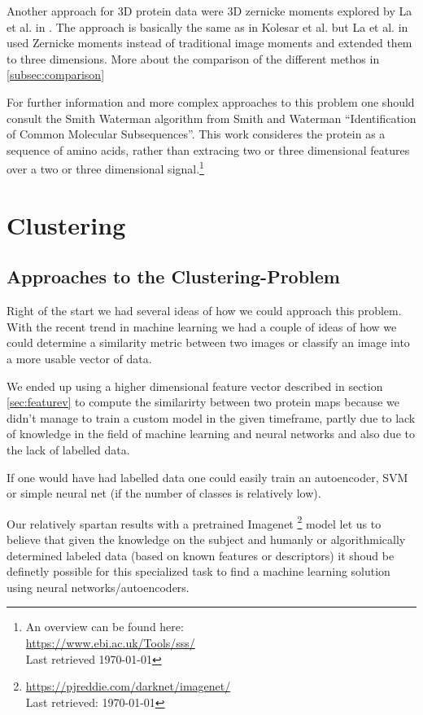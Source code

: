 \documentclass[journal]{vgtc}       %
\newcommand{\todo}[1]{\textcolor{red}{\textbf{TODO:} #1}}
\begin{document}
Another approach for 3D protein data were 3D zernicke moments explored by La et al. in \cite{3dsurfer}. The approach is basically the same as in Kolesar et al. but La et al.  in \cite{3dsurfer} used Zernicke moments instead of traditional image moments and extended them to three dimensions. More about the comparison of the different methos in \ref{subsec:comparison}

For further information and more complex approaches to this problem one should consult the Smith Waterman algorithm from Smith and Waterman ``Identification of Common Molecular Subsequences''\cite{smithwater}. This work consideres the protein as a sequence of amino acids, rather than extracing two or three dimensional features over a two or three dimensional signal.\footnote{An overview can be found here: \\ \url{https://www.ebi.ac.uk/Tools/sss/}\\ Last retrieved \today}


\section{Clustering}
\subsection{Approaches to the Clustering-Problem}

Right of the start we had several ideas of how we could approach this problem. 
With the recent trend in machine learning we had a couple of ideas of how we could determine a similarity metric between two images or classify an image into a more usable vector of data.

We ended up using a higher dimensional feature vector described in section \ref{sec:featurev} to  compute the similarirty between two protein maps because we didn't manage to train a custom model in the given timeframe, partly due to lack of knowledge in the field of machine learning and neural networks and also due to the lack of labelled data.

If one would have had labelled data one could easily train an autoencoder, SVM or simple neural net (if the number of classes is relatively low).

Our relatively spartan results with a pretrained Imagenet \cite{imagenet}\footnote{\url{https://pjreddie.com/darknet/imagenet/} \\ Last retrieved: \today}  model let us to believe that given the knowledge on the subject and humanly or algorithmically determined labeled data (based on known features or descriptors)   it shoud be definetly possible for this specialized task to find a machine learning  solution using neural networks/autoencoders.
\end{document}
